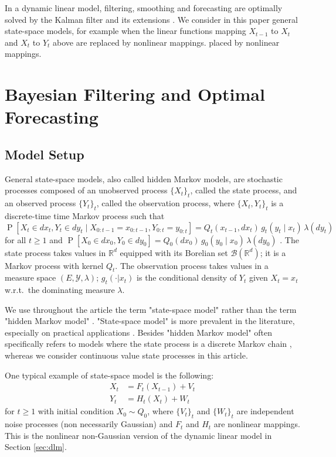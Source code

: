 \documentclass{article}
\newcommand{\R}{\mathbb R}
\DeclareMathOperator{\prob}{P}
\begin{document}
In a dynamic linear model, filtering, smoothing and forecasting are optimally solved by the Kalman filter and its extensions \cite{Kalman1960,Petris2009}. We consider in this paper general state-space models, for example when the linear functions mapping $X_{t-1}$ to $X_t$ and $X_t$ to $Y_t$ above are replaced by nonlinear mappings.
placed by nonlinear mappings.

\section{Bayesian Filtering and Optimal Forecasting}
\label{sec:filter-forecast}

\subsection{Model Setup}

General state-space models, also called hidden Markov models, are stochastic processes composed of an unobserved process $\{X_t\}_t$, called the state process, and an observed process $\{Y_t\}_t$, called the observation process, where $\{X_t, Y_t\}_t$ is a discrete-time time Markov process such that
\begin{equation*}
    \prob[X_t \in dx_t, Y_t \in dy_t \mid X_{0:t-1}=x_{0:t-1}, Y_{0:t}=y_{0:t}] = Q_t(x_{t-1},dx_t) \, g_t(y_t \mid x_t) \, \lambda(dy_t)
\end{equation*}
for all $t \geq 1$ and $\prob[X_0 \in dx_0, Y_0 \in dy_0] = Q_0(dx_0) \, g_0(y_0 \mid x_0) \, \lambda(dy_0)$ \cite[Chapter 1]{Cappe2005}. The state process takes values in $\R^d$ equipped with its Borelian set $\mathcal B(\R^d)$; it is a Markov process with kernel $Q_t$. The observation process takes values in a measure space $(E, \mathcal Y, \lambda)$; $g_t(\cdot | x_t)$ is the conditional density of $Y_t$ given $X_t=x_t$ w.r.t.\ the dominating measure $\lambda$.

We use throughout the article the term "state-space model"  \cite{Petris2009,Sarkka2013} rather than the term "hidden Markov model" \cite{Cappe2005}. "State-space model" is more prevalent in the literature, especially on practical applications \cite{Gustafsson2002,Petris2009}. Besides "hidden Markov model" often specifically refers to models where the state process is a discrete Markov chain \cite{Rabiner1989}, whereas we consider continuous value state processes in this article.

One typical example of state-space model is the following:
\begin{align}
    X_t &= F_t(X_{t-1}) + V_t \label{eq:nonlinear-state} \\
    Y_t &= H_t(X_t) + W_t \label{eq:nonlinear-obs}
\end{align}
for $t \geq 1$ with initial condition $X_0 \sim Q_0$, where $\{V_t\}_t$ and $\{W_t\}_t$ are independent noise processes (non necessarily Gaussian) and $F_t$ and $H_t$ are nonlinear mappings. This is the nonlinear non-Gaussian version of the dynamic linear model in Section \ref{sec:dlm}.
\end{document}
